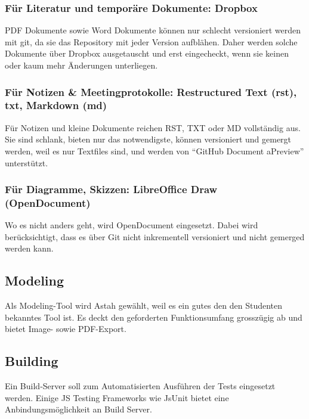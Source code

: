 			\subsubsection{Für Literatur und temporäre Dokumente: Dropbox}
				PDF Dokumente sowie Word Dokumente können nur schlecht versioniert werden mit git, da sie das Repository mit jeder Version aufblähen.
				Daher werden solche Dokumente über Dropbox ausgetauscht und erst eingecheckt, wenn sie keinen oder kaum mehr Änderungen unterliegen.

			\subsubsection{Für Notizen \& Meetingprotokolle: Restructured Text (rst), txt, Markdown (md)}
				Für Notizen und kleine Dokumente reichen RST, TXT oder MD vollständig aus. 
				Sie sind schlank, bieten nur das notwendigste, können versioniert und gemergt werden,
				weil es nur Textfiles sind, und werden von "`GitHub Document aPreview"'	unterstützt.

			\subsubsection{Für Diagramme, Skizzen: LibreOffice Draw (OpenDocument)}
				Wo es nicht anders geht, wird OpenDocument eingesetzt. Dabei wird
				berücksichtigt, dass es über Git nicht inkrementell versioniert und nicht
				gemerged werden kann.


		\subsection{Modeling}
			Als Modeling-Tool wird Astah gewählt, weil es ein gutes den den Studenten
			bekanntes Tool ist.
			Es deckt den geforderten Funktionsumfang grosszügig ab und bietet Image- sowie
			PDF-Export.

			



		\subsection{Building}
			Ein Build-Server soll zum Automatisierten Ausführen der Tests eingesetzt werden.
			Einige JS Testing Frameworks wie JsUnit bietet eine Anbindungsmöglichkeit an Build Server.
			
